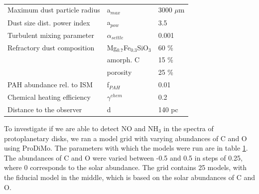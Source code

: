 \documentclass[twoside, single, authoryear, semicolon]{lion-msc}
\newcommand{\4}{$_4$}
\newcommand{\3}{$_3$}
\newcommand{\2}{$_2$}
\begin{document}
\begin{table}[!h]
\begin{tabular}{@{}lll@{}}
Maximum dust particle radius      & a$_{max}$                   & 3000 $\mu$m                \\
Dust size dist. power index       & a$_{pow}$                   & 3.5                        \\
Turbulent mixing parameter        & $\alpha_{settle}$           & 0.001                      \\
Refractory dust composition       & Mg$_{0.7}$Fe$_{0.3}$SiO\3 & 60 \%                      \\
                                  & amorph. C                   & 15 \%                      \\
                                  & porosity                    & 25 \%                      \\
PAH abundance rel. to ISM         & f$_{PAH}$                   & 0.01                       \\
Chemical heating efficiency       & $\gamma^{chem}$             & 0.2                        \\ \midrule
Distance to the observer          & d                           & 140 pc                     \\ \bottomrule
\end{tabular}
\caption{}
\label{tab:parameters}
\end{table}
To investigate if we are able to detect NO and NH\3 in the spectra of protoplanetary disks, 
we ran a model grid with varying abundances of C and O using ProDiMo. The parameters with which the models were run are in table \ref{tab:parameters}. The abundances of C and O were varied between -0.5 and 0.5 in steps of 0.25, where 0 corresponds to the solar abundance. The grid contains 25 models, with the fiducial model in the middle, which is based on the solar abundances of C and O.
\end{document}
